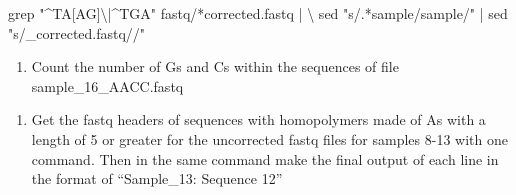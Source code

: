 \documentclass[
  letterpaper,
  DIV=11,
  numbers=noendperiod]{scrreprt}
\newenvironment{Shaded}{\begin{snugshade}}{\end{snugshade}}
\newcommand{\AttributeTok}[1]{\textcolor[rgb]{0.40,0.45,0.13}{#1}}
\newcommand{\DataTypeTok}[1]{\textcolor[rgb]{0.68,0.00,0.00}{#1}}
\newcommand{\FunctionTok}[1]{\textcolor[rgb]{0.28,0.35,0.67}{#1}}
\newcommand{\KeywordTok}[1]{\textcolor[rgb]{0.00,0.23,0.31}{#1}}
\newcommand{\NormalTok}[1]{\textcolor[rgb]{0.00,0.23,0.31}{#1}}
\newcommand{\PreprocessorTok}[1]{\textcolor[rgb]{0.68,0.00,0.00}{#1}}
\newcommand{\SpecialStringTok}[1]{\textcolor[rgb]{0.13,0.47,0.30}{#1}}
\newcommand{\StringTok}[1]{\textcolor[rgb]{0.13,0.47,0.30}{#1}}
\providecommand{\tightlist}{%
  \setlength{\itemsep}{0pt}\setlength{\parskip}{0pt}}\usepackage{longtable,booktabs,array}
\begin{document}
\begin{Shaded}
\begin{Highlighting}[]
\FunctionTok{grep} \StringTok{"\^{}TA[AG]\textbackslash{}|\^{}TGA"}\NormalTok{ fastq/}\PreprocessorTok{*}\NormalTok{corrected.fastq }\KeywordTok{|} \DataTypeTok{\textbackslash{}}
\FunctionTok{sed} \StringTok{"s/.*sample/sample/"} \KeywordTok{|} \FunctionTok{sed} \StringTok{"s/\_corrected.fastq//"}
\end{Highlighting}
\end{Shaded}

\begin{enumerate}
\def\labelenumi{\arabic{enumi}.}
\setcounter{enumi}{8}
\tightlist
\item
  Count the number of Gs and Cs within the sequences of file
  sample\_16\_AACC.fastq
\end{enumerate}

\begin{Shaded}
\end{Shaded}

\begin{enumerate}
\def\labelenumi{\arabic{enumi}.}
\setcounter{enumi}{9}
\tightlist
\item
  Get the fastq headers of sequences with homopolymers made of As with a
  length of 5 or greater for the uncorrected fastq files for samples
  8-13 with one command. Then in the same command make the final output
  of each line in the format of ``Sample\_13: Sequence 12''
\end{enumerate}

\begin{Shaded}
\end{Shaded}
\end{document}

